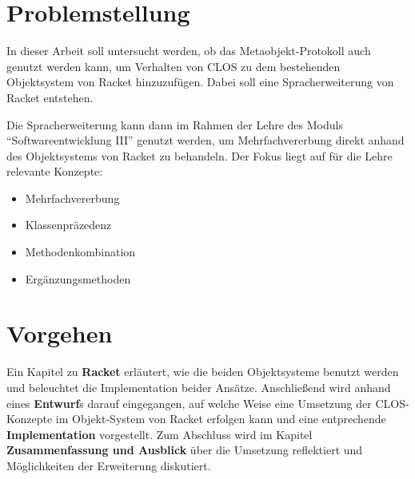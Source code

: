 \section{Problemstellung} 
In dieser Arbeit soll untersucht werden, ob das Metaobjekt-Protokoll auch genutzt werden kann, um Verhalten von CLOS zu dem bestehenden Objektsystem von Racket hinzuzufügen. Dabei soll eine Spracherweiterung von Racket entstehen. 

Die Spracherweiterung kann dann im Rahmen der Lehre des Moduls ``Softwareentwicklung III'' genutzt werden, um Mehrfachvererbung direkt anhand des Objektsystems von Racket zu behandeln. Der Fokus liegt auf für die Lehre relevante Konzepte: 
\begin{itemize}
 \item Mehrfachvererbung
 \item Klassenpräzedenz
 \item Methodenkombination
 \item Ergänzungsmethoden
\end{itemize}

% 


\section{Vorgehen}
Ein Kapitel zu \textbf{Racket} erläutert, wie die beiden Objektsysteme benutzt werden und beleuchtet die Implementation beider Ansätze. Anschließend wird anhand eines \textbf{Entwurf}s darauf eingegangen, auf welche Weise eine Umsetzung der CLOS-Konzepte im Objekt-System von Racket erfolgen kann und eine entprechende \textbf{Implementation} vorgestellt. Zum Abschluss wird im Kapitel \textbf{Zusammenfassung und Ausblick} über die Umsetzung reflektiert und Möglichkeiten der Erweiterung diskutiert.